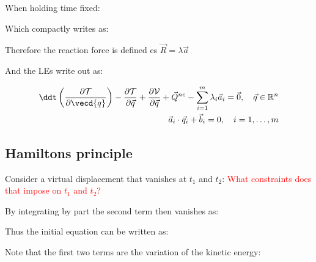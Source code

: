 \documentclass[10pt,a4paper]{scrartcl}
\begin{document}
\begin{multicols*}{2}

When holding time fixed:


Which compactly writes as:


Therefore the reaction force is defined es $\vec{R}=\lambda\vec{a}$

And the LEs write out as:

\begin{align*}
\ddt\left(\frac{\partial\mathcal{T}}{\partial\vecd{q}}\right)-\frac{\partial\mathcal{T}}{\partial\vec{q}}+\frac{\partial\mathcal{V}}{\partial\vec{q}}+\vec{Q}^{nc}-\sum\limits_{i=1}^m\lambda_i\vec{a}_i=\vec{0},\quad\vec{q}\in\mathbb{R}^n\\
\vec{a}_i\cdot\vec{q}_i+\vec{b}_i=0,\quad i=1,\ldots,m
\end{align*}

\subsection{Hamiltons principle}


Consider a virtual displacement that vanishes at $t_1$ and $t_2$: \textcolor{red}{What constraints does that impose on $t_1$ and $t_2$?}


By integrating by part the second term then vanishes as:


Thus the initial equation can be written as:


Note that the first two terms are the variation of the kinetic energy:


\end{multicols*}
\end{document}
